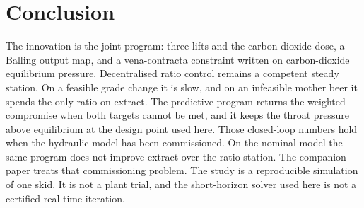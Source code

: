 \documentclass[11pt,a4paper]{article}
\begin{document}
\section{Conclusion}
The innovation is the joint program: three lifts and the carbon-dioxide dose, a Balling output map, and a vena-contracta constraint written on carbon-dioxide equilibrium pressure. Decentralised ratio control remains a competent steady station. On a feasible grade change it is slow, and on an infeasible mother beer it spends the only ratio on extract. The predictive program returns the weighted compromise when both targets cannot be met, and it keeps the throat pressure above equilibrium at the design point used here. Those closed-loop numbers hold when the hydraulic model has been commissioned. On the nominal model the same program does not improve extract over the ratio station. The companion paper treats that commissioning problem. The study is a reproducible simulation of one skid. It is not a plant trial, and the short-horizon solver used here is not a certified real-time iteration.



\end{document}
